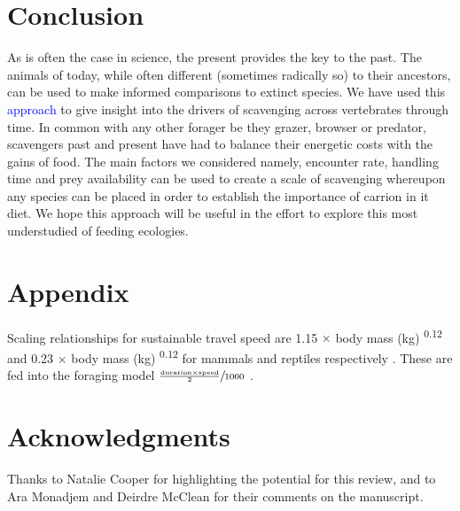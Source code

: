 \documentclass[a4paper,12pt]{article}
\begin{document}
\section*{Conclusion}
As is often the case in science, the present provides the key to the past.
The animals of today, while often different (sometimes radically so) to their ancestors, can be used to make informed comparisons to extinct species. 
We have used this \textcolor{blue}{approach} to give insight into the drivers of scavenging across vertebrates through time.
In common with any other forager be they grazer, browser or predator, scavengers past and present have had to balance their energetic costs with the gains of food. 
The main factors we considered namely, encounter rate, handling time and prey availability can be used to create a scale of scavenging whereupon any species can be placed in order to establish the importance of carrion in it diet.
We hope this approach will be useful in the effort to explore this most understudied of feeding ecologies. 

\section*{Appendix}
Scaling relationships for sustainable travel speed are 1.15 $\times$ body mass (kg) \textsuperscript{0.12} and 0.23 $\times$ body mass (kg) \textsuperscript{0.12} for mammals and reptiles respectively \citep{ruxton2004obligate}.
These are fed into the foraging model $\sfrac{\frac{\text{duration} \times \text{speed}}{2}}{1000}$ \citep{Enstipp2006Energetics}.

\section*{Acknowledgments}
Thanks to Natalie Cooper for highlighting the potential for this review, and to Ara Monadjem and Deirdre McClean for their comments on the manuscript. 

\newpage


\end{document}
